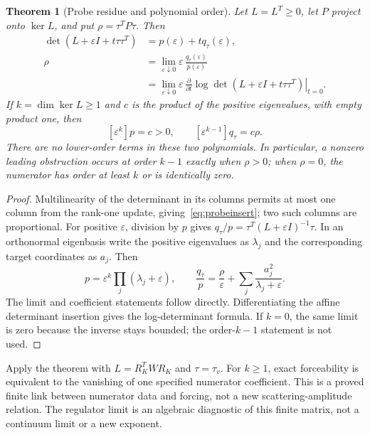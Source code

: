 \documentclass[11pt,letterpaper]{article}
\newtheorem{theorem}{Theorem}[section]
\theoremstyle{definition}
\theoremstyle{remark}\newtheorem{remark}[theorem]{Remark}
\begin{document}
\begin{theorem}[Probe residue and polynomial order]\label{thm:proberesidue}
Let $L=L^T\geq0$, let $P$ project onto $\ker L$, and put $\rho=\tau^TP\tau$. Then
\begin{align}
\det(L+\varepsilon I+t\tau\tau^T)
 &=p(\varepsilon)+tq_\tau(\varepsilon),\label{eq:probeinsert}\\
\rho&=\lim_{\varepsilon\downarrow0}\varepsilon\,
\frac{q_\tau(\varepsilon)}{p(\varepsilon)}\nonumber\\
&=\lim_{\varepsilon\downarrow0}\varepsilon\,
\left.\frac{\partial}{\partial t}\log\det(L+\varepsilon I+t\tau\tau^T)\right|_{t=0}.
\label{eq:probelimit}
\end{align}
If $k=\dim\ker L\geq1$ and $c$ is the product of the positive eigenvalues, with empty product one, then
\begin{equation}\label{eq:leadingprobe}
[\varepsilon^k]p=c>0,\qquad
[\varepsilon^{k-1}]q_\tau=c\rho.
\end{equation}
There are no lower-order terms in these two polynomials. In particular, a nonzero leading obstruction occurs at order $k-1$ exactly when $\rho>0$; when $\rho=0$, the numerator has order at least $k$ or is identically zero.
\end{theorem}
\begin{proof}
Multilinearity of the determinant in its columns permits at most one column from the rank-one update, giving~\eqref{eq:probeinsert}; two such columns are proportional. For positive $\varepsilon$, division by $p$ gives $q_\tau/p=\tau^T(L+\varepsilon I)^{-1}\tau$. In an orthonormal eigenbasis write the positive eigenvalues as $\lambda_j$ and the corresponding target coordinates as $a_j$. Then
\[
p=\varepsilon^k\prod_j(\lambda_j+\varepsilon),\qquad
\frac{q_\tau}{p}=\frac{\rho}{\varepsilon}+\sum_j\frac{a_j^2}{\lambda_j+\varepsilon}.
\]
The limit and coefficient statements follow directly. Differentiating the affine determinant insertion gives the log-determinant formula. If $k=0$, the same limit is zero because the inverse stays bounded; the order-$k-1$ statement is not used.
\end{proof}
Apply the theorem with $L=R_K^TWR_K$ and $\tau=\tau_v$. For $k\geq1$, exact forceability is equivalent to the vanishing of one specified numerator coefficient. This is a proved finite link between numerator data and forcing, not a new scattering-amplitude relation. The regulator limit is an algebraic diagnostic of this finite matrix, not a continuum limit or a new exponent.
\end{document}
